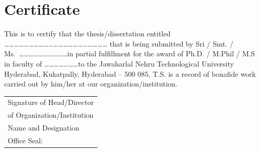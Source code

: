 \chapter*{Certificate}
\thispagestyle{plain}
This is to certify that the thesis/dissertation entitled
\textit{\ldots\ldots\ldots\ldots\ldots\ldots\ldots\ldots\ldots\ldots\ldots\ldots\ldots\ldots\ldots\ldots\ldots\ldots\ldots\ldots\ldots}
that is being submitted by Sri / Smt. / Ms.\
\ldots\ldots\ldots\ldots\ldots\ldots\ldots\ldots\ldots\ldots in partial
fulfillment for the award of Ph.D. / M.Phil / M.S in faculty of
\ldots\ldots\ldots\ldots\ldots\ldots\ldots to the Jawaharlal Nehru
Technological University Hyderabad, Kukatpally, Hyderabad -- 500 085,
T.S. is a record of bonafide work carried out by him/her at our
organization/institution.

\vspace{3cm}

\noindent
\begin{tabular}{l}
    Signature of Head/Director \\[2cm]
    of Organization/Institution \\[0.5cm]
    Name and Designation \\[1cm]
    Office Seal: \\
\end{tabular}

\newpage
